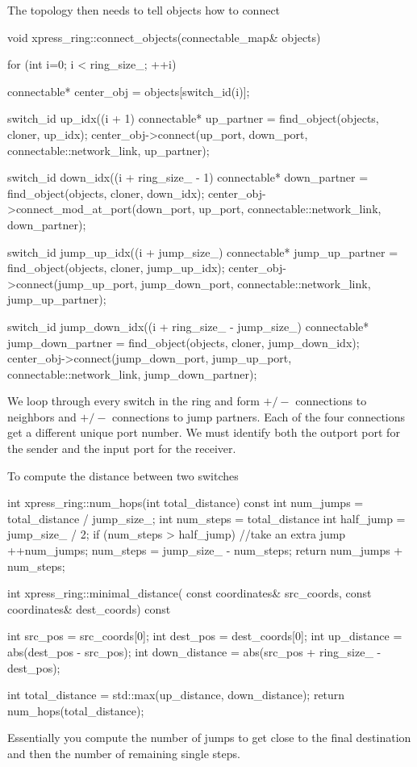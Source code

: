 The topology then needs to tell objects how to connect

\begin{CppCode}
void
xpress_ring::connect_objects(connectable_map& objects)
{
  for (int i=0; i < ring_size_; ++i) {
    connectable* center_obj = objects[switch_id(i)];

    switch_id up_idx((i + 1) %
    connectable* up_partner = find_object(objects, cloner, up_idx);
    center_obj->connect(up_port, down_port, connectable::network_link, up_partner);

    switch_id down_idx((i + ring_size_ - 1) %
    connectable* down_partner = find_object(objects, cloner, down_idx);
    center_obj->connect_mod_at_port(down_port, up_port, connectable::network_link,
                                    down_partner);

    switch_id jump_up_idx((i + jump_size_) %
    connectable* jump_up_partner = find_object(objects, cloner, jump_up_idx);
    center_obj->connect(jump_up_port, jump_down_port, connectable::network_link,
                                    jump_up_partner);

    switch_id jump_down_idx((i + ring_size_ - jump_size_) %
    connectable* jump_down_partner = find_object(objects, cloner,
                                         jump_down_idx);
    center_obj->connect(jump_down_port, jump_up_port, connectable::network_link,
                                    jump_down_partner);
  }
}
\end{CppCode}
We loop through every switch in the ring and form $+/-$ connections to neighbors and $+/-$ connections to jump partners.
Each of the four connections get a different unique port number.  We must identify both the outport port for the sender and the input port for the receiver.

To compute the distance between two switches

\begin{CppCode}
int
xpress_ring::num_hops(int total_distance) const
{
  int num_jumps = total_distance / jump_size_;
  int num_steps = total_distance %
  int half_jump = jump_size_ / 2;
  if (num_steps > half_jump) {
    //take an extra jump
    ++num_jumps;
    num_steps = jump_size_ - num_steps;
  }
  return num_jumps + num_steps;
}

int
xpress_ring::minimal_distance(
  const coordinates& src_coords,
  const coordinates& dest_coords) const
{
  int src_pos = src_coords[0];
  int dest_pos = dest_coords[0];
  int up_distance = abs(dest_pos - src_pos);
  int down_distance = abs(src_pos + ring_size_ - dest_pos);

  int total_distance = std::max(up_distance, down_distance);
  return num_hops(total_distance);
}
\end{CppCode}
Essentially you compute the number of jumps to get close to the final destination and then the number of remaining single steps.


